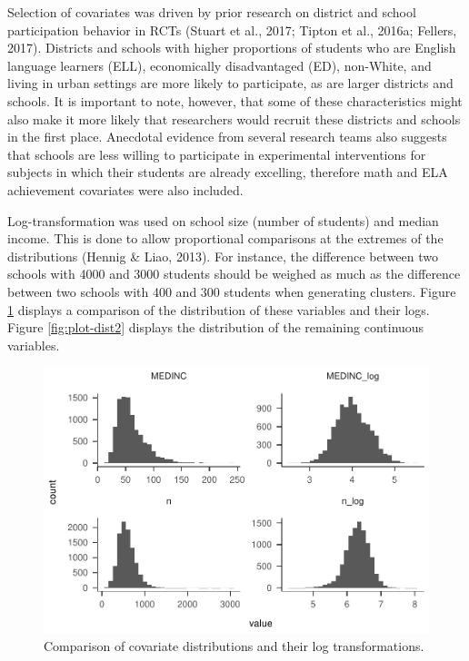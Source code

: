 \documentclass[man,floatsintext]{apa6}
\begin{document}
Selection of covariates was driven by prior research on district and school participation behavior in RCTs (Stuart et al., 2017; Tipton et al., 2016a; Fellers, 2017). Districts and schools with higher proportions of students who are English language learners (ELL), economically disadvantaged (ED), non-White, and living in urban settings are more likely to participate, as are larger districts and schools. It is important to note, however, that some of these characteristics might also make it more likely that researchers would recruit these districts and schools in the first place. Anecdotal evidence from several research teams also suggests that schools are less willing to participate in experimental interventions for subjects in which their students are already excelling, therefore math and ELA achievement covariates were also included.

Log-transformation was used on school size (number of students) and median income. This is done to allow proportional comparisons at the extremes of the distributions (Hennig \& Liao, 2013). For instance, the difference between two schools with 4000 and 3000 students should be weighed as much as the difference between two schools with 400 and 300 students when generating clusters. Figure \ref{fig:plot-dist1} displays a comparison of the distribution of these variables and their logs. Figure \ref{fig:plot-dist2} displays the distribution of the remaining continuous variables.

\begin{figure}
\centering
\includegraphics{GenSamp_Paper_files/figure-latex/plot-dist1-1.pdf}
\caption{\label{fig:plot-dist1}Comparison of covariate distributions and their log transformations.}
\end{figure}
\end{document}
